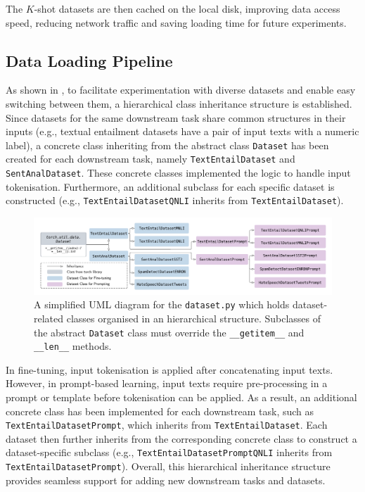 The $K$-shot datasets are then cached on the local disk, improving data access speed, reducing network traffic and saving loading time for future experiments. 

\subsection{Data Loading Pipeline} \label{sec:dataset-2}
As shown in , to facilitate experimentation with diverse datasets and enable easy switching between them, a hierarchical class inheritance structure is established. Since datasets for the same downstream task share common structures in their inputs (e.g., textual entailment datasets have a pair of input texts with a numeric label), a concrete class inheriting from the abstract class \texttt{Dataset} has been created for each downstream task, namely \texttt{TextEntailDataset} and \texttt{SentAnalDataset}. These concrete classes implemented the logic to handle input tokenisation. Furthermore, an additional subclass for each specific dataset is constructed (e.g., \texttt{TextEntailDatasetQNLI} inherits from \texttt{TextEntailDataset}).

\begin{figure}[!ht]
    \centering
    \includegraphics[width=\hsize]{figures/implementation_media/impl-datasets.pdf}
    \caption{A simplified UML diagram for the \texttt{dataset.py} which holds dataset-related classes organised in an hierarchical structure. Subclasses of the abstract \texttt{Dataset} class must override the \texttt{\_\_getitem\_\_} and \texttt{\_\_len\_\_} methods.}
    \label{fig:impl-datasets}
\end{figure}

In fine-tuning, input tokenisation is applied after concatenating input texts. However, in prompt-based learning, input texts require pre-processing in a prompt or template before tokenisation can be applied. As a result, an additional concrete class has been implemented for each downstream task, such as \texttt{TextEntailDatasetPrompt}, which inherits from \texttt{TextEntailDataset}. Each dataset then further inherits from the corresponding concrete class to construct a dataset-specific subclass (e.g., \texttt{TextEntailDatasetPromptQNLI} inherits from \texttt{TextEntailDatasetPrompt}). Overall, this hierarchical inheritance structure provides seamless support for adding new downstream tasks and datasets.

